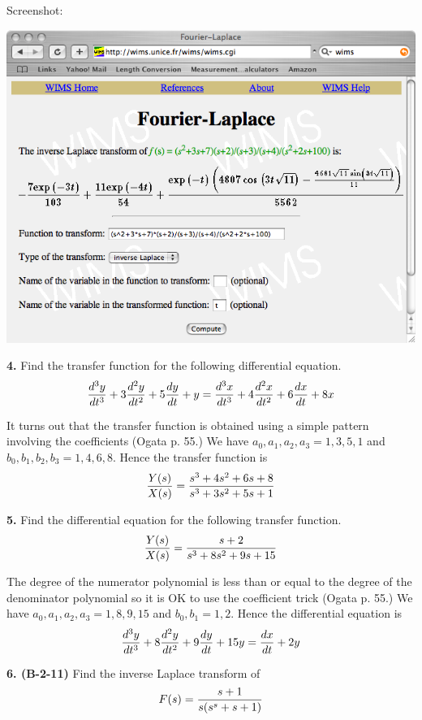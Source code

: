 \documentclass[11pt]{report}
\begin{document}
\bigskip
\noindent
Screenshot:
\begin{center}
\includegraphics[scale=0.5]{images/inverse-laplace-tool.png}
\end{center}

\newpage

\noindent
{\bf 4.} Find the transfer function for the following differential
equation.
$${d^3y\over dt^3}+3{d^2y\over dt^2}+5{dy\over dt}+y
={d^3x\over dt^3}+4{d^2x\over dt^2}+6{dx\over dt}+8x$$

\bigskip
\noindent
It turns out that the transfer function is obtained using a simple pattern
involving the coefficients (Ogata p. 55.)
We have
$a_0,a_1,a_2,a_3=1,3,5,1$ and $b_0,b_1,b_2,b_3=1,4,6,8$.
Hence the transfer function is
$${Y(s)\over X(s)}={s^3+4s^2+6s+8\over s^3+3s^2+5s+1}$$

\bigskip
\noindent
{\bf 5.} Find the differential equation for the following transfer function.
$${Y(s)\over X(s)}={s+2\over s^3+8s^2+9s+15}$$

\bigskip
\noindent
The degree of the numerator polynomial is less than or equal to the degree of
the denominator polynomial so it is OK to use the coefficient trick
(Ogata p. 55.)
We have $a_0,a_1,a_2,a_3=1,8,9,15$ and $b_0,b_1=1,2$.
Hence the differential equation is
$${d^3y\over dt^3}+8{d^2y\over dt^2}+9{dy\over dt}+15y
={dx\over dt}+2y$$

\newpage

\noindent
{\bf 6. (B-2-11)} Find the inverse Laplace transform of
$$F(s)={s+1\over s(s^s+s+1)}$$
\end{document}
